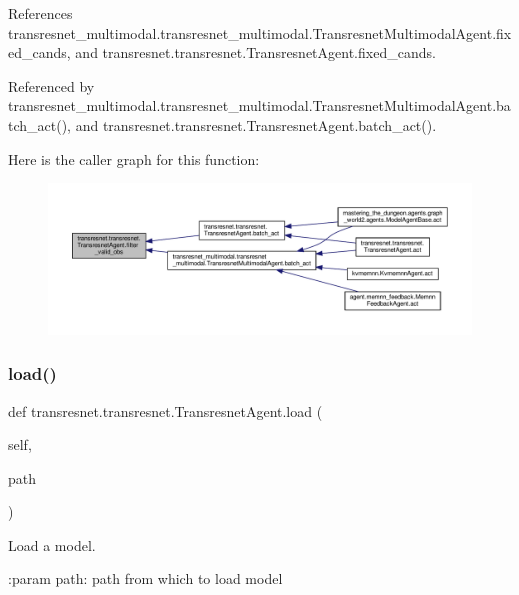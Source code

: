References transresnet\+\_\+multimodal.\+transresnet\+\_\+multimodal.\+Transresnet\+Multimodal\+Agent.\+fixed\+\_\+cands, and transresnet.\+transresnet.\+Transresnet\+Agent.\+fixed\+\_\+cands.



Referenced by transresnet\+\_\+multimodal.\+transresnet\+\_\+multimodal.\+Transresnet\+Multimodal\+Agent.\+batch\+\_\+act(), and transresnet.\+transresnet.\+Transresnet\+Agent.\+batch\+\_\+act().

Here is the caller graph for this function\+:
\nopagebreak
\begin{figure}[H]
\begin{center}
\leavevmode
\includegraphics[width=350pt]{classtransresnet_1_1transresnet_1_1TransresnetAgent_a96ebfee0a6b2acf1c1d1696befd397e3_icgraph}
\end{center}
\end{figure}
\mbox{\label{classtransresnet_1_1transresnet_1_1TransresnetAgent_aa2fa1c344748a14803792c3bde4f4c13}} 
\subsubsection{\texorpdfstring{load()}{load()}}
{\footnotesize\ttfamily def transresnet.\+transresnet.\+Transresnet\+Agent.\+load (\begin{DoxyParamCaption}\item[{}]{self,  }\item[{}]{path }\end{DoxyParamCaption})}

\begin{DoxyVerb}Load a model.

:param path:
    path from which to load model
\end{DoxyVerb}
 

